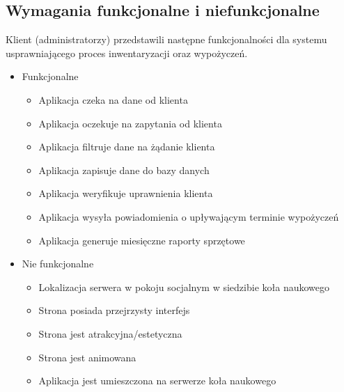 \documentclass{article}
\begin{document}
    \newpage
    \subsection{Wymagania funkcjonalne i niefunkcjonalne}
    Klient (administratorzy) przedstawili następne funkcjonalności dla systemu usprawniającego proces inwentaryzacji oraz wypożyczeń.
        \begin{itemize}
            \item Funkcjonalne
            
            \begin{itemize}
                \item Aplikacja czeka na dane od klienta
                \item Aplikacja oczekuje na zapytania od klienta
                \item Aplikacja filtruje dane na żądanie klienta
                \item Aplikacja zapisuje dane do bazy danych
                \item Aplikacja weryfikuje uprawnienia klienta
                \item Aplikacja wysyła powiadomienia o upływającym terminie wypożyczeń
                \item Aplikacja generuje miesięczne raporty sprzętowe
            \end{itemize}

            \item Nie funkcjonalne 

            \begin{itemize}
                \item Lokalizacja serwera w pokoju socjalnym w siedzibie koła naukowego
                \item Strona posiada przejrzysty interfejs
                \item Strona jest atrakcyjna/estetyczna
                \item Strona jest animowana
                \item Aplikacja jest umieszczona na serwerze koła naukowego
            \end{itemize}
            
        \end{itemize}
\end{document}
